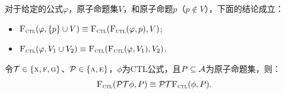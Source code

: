 \documentclass[aspectratio=1610, 9pt, CJK]{beamer}
\begin{document}
\begin{frame}
{{			%
			\begin{proposition}\label{disTF}
				对于给定的公式$\varphi$，原子命题集$V$，和原子命题$p$（$p\not \in V$），下面的结论成立：
				\begin{itemize}
					\item ${\textsc{F}_{\textsc{ctl}}}(\varphi,\{p\}\cup V) \equiv {\textsc{F}_{\textsc{ctl}}}({\textsc{F}_{\textsc{ctl}}}(\varphi,p),V)$;
					\item $	{\textsc{F}_{\textsc{ctl}}}(\varphi,V_1\cup V_2) \equiv {\textsc{F}_{\textsc{ctl}}}({\textsc{F}_{\textsc{ctl}}}(\varphi,V_1),V_2)$.
				\end{itemize} 
			\end{proposition}
			\begin{proposition}[同质性]\label{pro:ctl:forget:2}
				令${\cal T} \in \{\textsc{x}, \textsc{f}, \textsc{g}\}$、${\cal P} \in \{\textsc{a}, \textsc{e}\}$，$\phi$为CTL公式，且$P\subseteq\cal A$为原子命题集，则：
				$${\textsc{F}_{\textsc{ctl}}}({\cal P}{\cal T}\phi,P)\equiv {\cal P}{\cal T} {\textsc{F}_{\textsc{ctl}}}(\phi,P).$$
			\end{proposition}
		}
	}
\end{frame}
\end{document}

